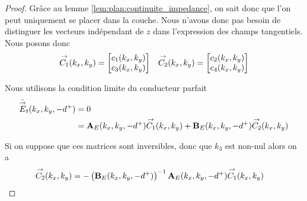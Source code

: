         \begin{proof}
            Grâce au lemme \eqref{lem:plan:continuite_impedance}, on sait donc que l'on peut uniquement se placer dans la couche. Nous n'avons donc pas besoin de distinguer les vecteurs indépendant de \(z\) dans l'expression des champs tangentiels. Nous posons donc
            \begin{align}
                {\overset{\rightarrow}{C_1}}(k_x,k_y) = \begin{bmatrix}c_1(k_x,k_y) \\ c_3(k_x,k_y)\end{bmatrix} & & {\overset{\rightarrow}{C_2}}(k_x,k_y) = \begin{bmatrix}c_2(k_x,k_y) \\ c_4(k_x,k_y)\end{bmatrix}
            \end{align}

            Nous utilisons la condition limite du conducteur parfait
            \begin{align}
                \hat{{\overset{\rightarrow}{E}}}_t(k_x,k_y,-d^+) &= 0
                \\
                &=  \mathbf{A}_E(k_x,k_y,-d^+){\overset{\rightarrow}{C_1}}(k_x,k_y) + \mathbf{B}_E(k_x,k_y,-d^+){\overset{\rightarrow}{C_2}}(k_x,k_y)
            \end{align}

            Si on suppose que ces matrices sont inversibles, donc que \(k_3\) est non-nul alors on a
            \begin{align}
                {\overset{\rightarrow}{C_2}}(k_x,k_y) &= -\left(\mathbf{B}_E(k_x,k_y,-d^+)\right)^{-1}\mathbf{A}_E(k_x,k_y,-d^+){\overset{\rightarrow}{C_1}}(k_x,k_y)
            \end{align}


\end{proof}
